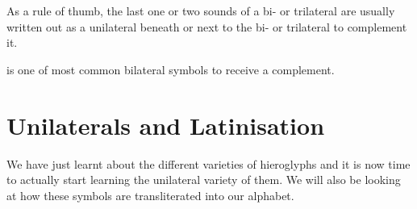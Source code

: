 \documentclass[a5paper,twoside,11pt]{report}
\begin{document}
		As a rule of thumb, the last one or two sounds of a bi- or trilateral are usually written out as a unilateral beneath or next to the bi- or trilateral to complement it.\begin{hieroglyph}{\leavevmode {}}\end{hieroglyph} is one of most common bilateral symbols to receive a complement.

\chapter*{Unilaterals and Latinisation}

    We have just learnt about the different varieties of hieroglyphs and it is now time to actually start learning the unilateral variety of them. We will also be looking at how these symbols are transliterated into our alphabet.
    
\end{document}
